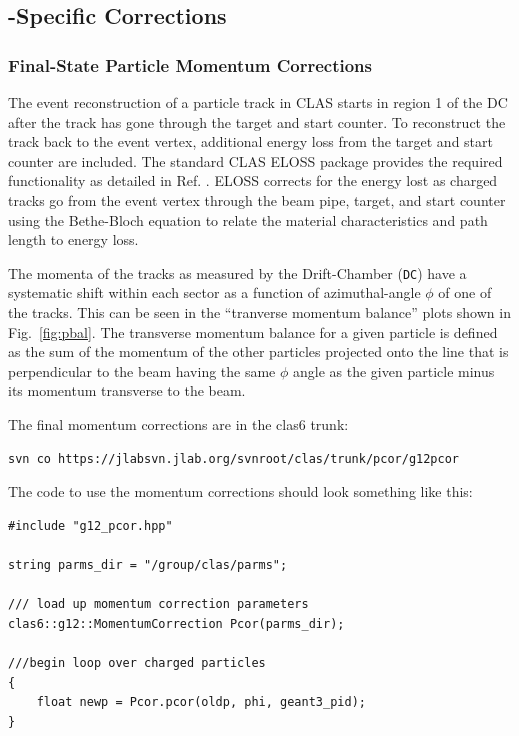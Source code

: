 \subsection{\label{sec:corrections}-Specific Corrections}

\subsubsection{\label{sec:corrections.pcor}Final-State Particle Momentum Corrections}

The event reconstruction of a particle track in CLAS starts in region 1 of the DC after the track has gone through the target and start counter. To reconstruct the track back to the event vertex, additional energy loss from the target and start counter are included. The standard CLAS ELOSS package provides the required functionality as detailed in Ref. \cite{eloss}. ELOSS corrects for the energy lost as charged tracks go from the event vertex through the beam pipe, target, and start counter using the Bethe-Bloch equation \cite{PDG} to relate the material characteristics and path length to energy loss.

The momenta of the tracks as measured by the Drift-Chamber (\texttt{DC}) have a systematic shift within each sector as a function of azimuthal-angle $\phi$ of one of the tracks. This can be seen in the ``tranverse momentum balance'' plots shown in Fig.~\ref{fig:pbal}. The transverse momentum balance for a given particle is defined as the sum of the momentum of the other particles projected onto the line that is perpendicular to the beam having the same $\phi$ angle as the given particle minus its momentum transverse to the beam.

The final  momentum corrections are in the clas6 trunk:
\begin{verbatim}
svn co https://jlabsvn.jlab.org/svnroot/clas/trunk/pcor/g12pcor
\end{verbatim}


The code to use the momentum corrections should look something like this:
\begin{verbatim}
#include "g12_pcor.hpp"

string parms_dir = "/group/clas/parms";

/// load up momentum correction parameters
clas6::g12::MomentumCorrection Pcor(parms_dir);

///begin loop over charged particles
{
    float newp = Pcor.pcor(oldp, phi, geant3_pid);
}
\end{verbatim}

